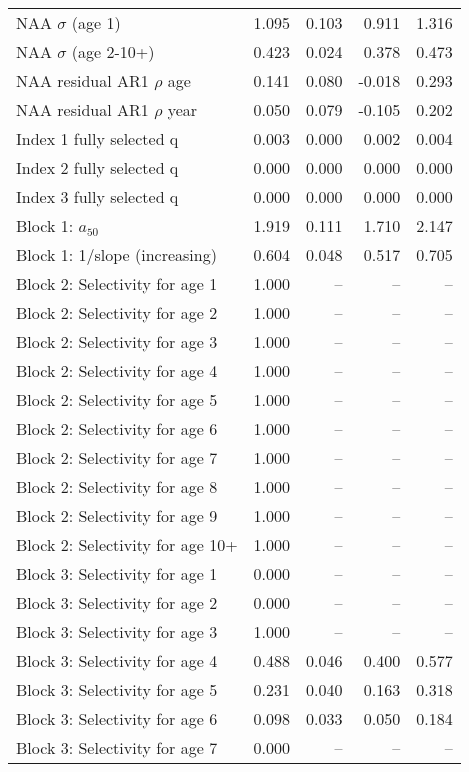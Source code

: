 \documentclass[
]{article}
\begin{document}
\begin{landscape}
\begin{longtable}[t]{lrrrr}
\endfoot
\bottomrule
\endlastfoot
NAA $\sigma$ (age 1) & 1.095 & 0.103 & 0.911 & 1.316\\
NAA $\sigma$ (age 2-10+) & 0.423 & 0.024 & 0.378 & 0.473\\
NAA residual AR1 $\rho$ age & 0.141 & 0.080 & -0.018 & 0.293\\
NAA residual AR1 $\rho$ year & 0.050 & 0.079 & -0.105 & 0.202\\
Index 1 fully selected q & 0.003 & 0.000 & 0.002 & 0.004\\
\addlinespace
Index 2 fully selected q & 0.000 & 0.000 & 0.000 & 0.000\\
Index 3 fully selected q & 0.000 & 0.000 & 0.000 & 0.000\\
Block 1: $a_{50}$ & 1.919 & 0.111 & 1.710 & 2.147\\
Block 1: 1/slope (increasing) & 0.604 & 0.048 & 0.517 & 0.705\\
Block 2: Selectivity for age 1 & 1.000 & -- & -- & --\\
\addlinespace
Block 2: Selectivity for age 2 & 1.000 & -- & -- & --\\
Block 2: Selectivity for age 3 & 1.000 & -- & -- & --\\
Block 2: Selectivity for age 4 & 1.000 & -- & -- & --\\
Block 2: Selectivity for age 5 & 1.000 & -- & -- & --\\
Block 2: Selectivity for age 6 & 1.000 & -- & -- & --\\
\addlinespace
Block 2: Selectivity for age 7 & 1.000 & -- & -- & --\\
Block 2: Selectivity for age 8 & 1.000 & -- & -- & --\\
Block 2: Selectivity for age 9 & 1.000 & -- & -- & --\\
Block 2: Selectivity for age 10+ & 1.000 & -- & -- & --\\
Block 3: Selectivity for age 1 & 0.000 & -- & -- & --\\
\addlinespace
Block 3: Selectivity for age 2 & 0.000 & -- & -- & --\\
Block 3: Selectivity for age 3 & 1.000 & -- & -- & --\\
Block 3: Selectivity for age 4 & 0.488 & 0.046 & 0.400 & 0.577\\
Block 3: Selectivity for age 5 & 0.231 & 0.040 & 0.163 & 0.318\\
Block 3: Selectivity for age 6 & 0.098 & 0.033 & 0.050 & 0.184\\
\addlinespace
Block 3: Selectivity for age 7 & 0.000 & -- & -- & --\\

\end{longtable}
\end{landscape}
\end{document}
